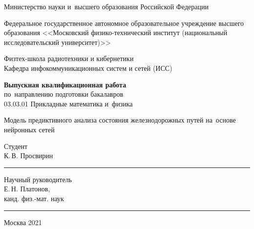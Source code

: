 \begin{titlepage}\centering
	\begin{small}
		Министерство науки и~высшего образования Российской Федерации
		
		Федеральное государственное автономное образовательное учреждение высшего образования <<Московский физико-технический институт (национальный исследовательский университет)>>
		
		Физтех-школа радиотехники и кибернетики\\
		Кафедра инфокоммуникационных систем и сетей (ИСС)
	\end{small}
	
	\vfill
	\textbf{Выпускная квалификационная работа}\\
	по~направлению подготовки бакалавров\\
	03.03.01 Прикладные математика и~физика
	
	\vspace{1.0cm}
	\large
	Модель предиктивного анализа состояния железнодорожных путей на~основе нейронных сетей
	
	\vspace{2.0cm}
	\normalsize
	\hfill
	\begin{minipage}{.4\textwidth}
		Студент\\
		К.\,В. Просвирин\\[2ex]
		\hrule
		
		\vspace{1cm}
		Научный руководитель\\
		Е.\,Н. Платонов,\\
		канд. физ.-мат. наук\\[2ex]
		\hrule
	\end{minipage}
	
	\vfill
	\small
	Москва 2021
\end{titlepage}